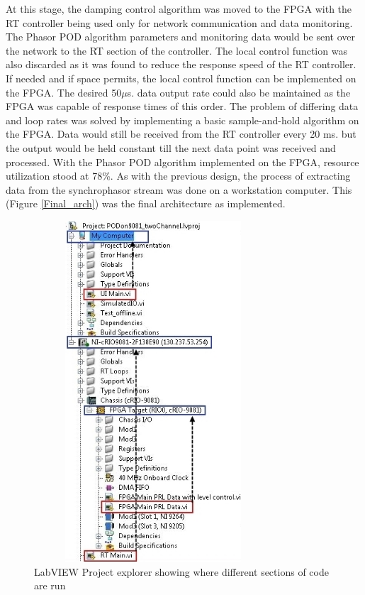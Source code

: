 \documentclass[conference]{IEEEtran}
\begin{document}
At this stage, the damping control algorithm was moved to the FPGA with the RT controller being used only for network communication and data monitoring. The  Phasor POD algorithm parameters and monitoring data would be sent over the network to the RT section of the controller. The local control function was also discarded as it was found to reduce the response speed of the RT controller. If needed and if space permits, the local control function can be implemented on the FPGA. The desired 50$\mu$s. data output rate could also be maintained as the FPGA was capable of response times of this order. The problem of differing data and loop rates was solved by implementing a basic sample-and-hold algorithm on the FPGA. Data would still be received from the RT controller every 20 ms. but the output would be held constant till the next data point was received and processed. With the Phasor POD algorithm implemented on the FPGA, resource utilization stood at 78\%. As with the previous design, the process of extracting data from the synchrophasor stream was done on a workstation computer. This (Figure \ref{Final_arch}) was the final architecture as implemented. %
\begin{figure}[h]
	\centering
	\includegraphics[width=3.5in,height=5in]{LabVIEWProj.JPG} 
	\caption{LabVIEW Project explorer showing where different sections of code are run}
	\label{Two_area}
\end{figure}
\end{document}
